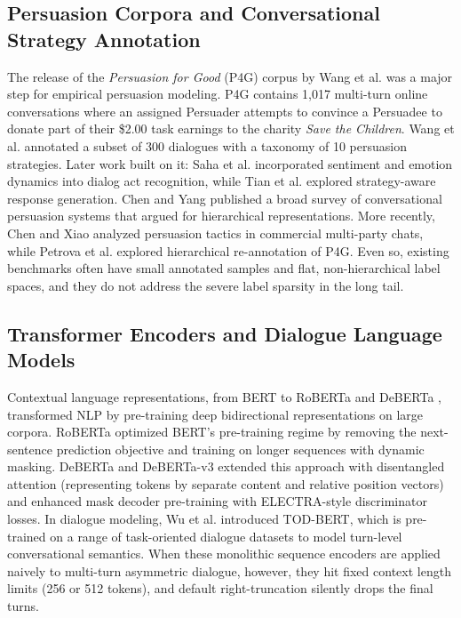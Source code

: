 \subsection{Persuasion Corpora and Conversational Strategy Annotation}
The release of the \textit{Persuasion for Good} (P4G) corpus by Wang et al. \cite{wang2019persuasion} was a major step for empirical persuasion modeling. P4G contains 1,017 multi-turn online conversations where an assigned Persuader attempts to convince a Persuadee to donate part of their \$2.00 task earnings to the charity \textit{Save the Children}. Wang et al. annotated a subset of 300 dialogues with a taxonomy of 10 persuasion strategies. Later work built on it: Saha et al. \cite{saha2021towards} incorporated sentiment and emotion dynamics into dialog act recognition, while Tian et al. \cite{tian2020towards} explored strategy-aware response generation. Chen and Yang \cite{chen2021persuasion} published a broad survey of conversational persuasion systems that argued for hierarchical representations. More recently, Chen and Xiao \cite{chen2025tactics} analyzed persuasion tactics in commercial multi-party chats, while Petrova et al. \cite{petrova2026revisiting} explored hierarchical re-annotation of P4G. Even so, existing benchmarks often have small annotated samples and flat, non-hierarchical label spaces, and they do not address the severe label sparsity in the long tail.

\subsection{Transformer Encoders and Dialogue Language Models}
Contextual language representations, from BERT \cite{devlin2019bert} to RoBERTa \cite{liu2019roberta} and DeBERTa \cite{he2020deberta}, transformed NLP by pre-training deep bidirectional representations on large corpora. RoBERTa optimized BERT's pre-training regime by removing the next-sentence prediction objective and training on longer sequences with dynamic masking. DeBERTa and DeBERTa-v3 \cite{he2021debertav3} extended this approach with disentangled attention (representing tokens by separate content and relative position vectors) and enhanced mask decoder pre-training with ELECTRA-style \cite{clark2020electra} discriminator losses. In dialogue modeling, Wu et al. \cite{wu2020todbert} introduced TOD-BERT, which is pre-trained on a range of task-oriented dialogue datasets to model turn-level conversational semantics. When these monolithic sequence encoders are applied naively to multi-turn asymmetric dialogue, however, they hit fixed context length limits (256 or 512 tokens), and default right-truncation silently drops the final turns.

